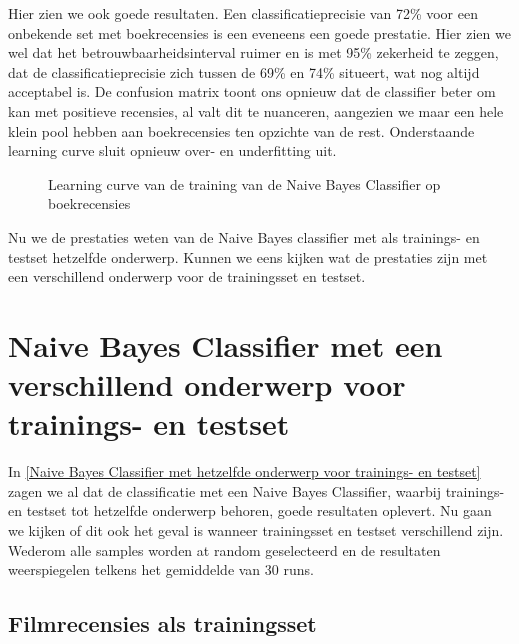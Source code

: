 Hier zien we ook goede resultaten. Een classificatieprecisie van 72\% voor een onbekende set met boekrecensies is een eveneens een goede prestatie. Hier zien we wel dat het betrouwbaarheidsinterval ruimer en is met 95\% zekerheid te zeggen, dat de classificatieprecisie zich tussen de 69\% en 74\% situeert, wat nog altijd acceptabel is. De confusion matrix toont ons opnieuw dat de classifier beter om kan met positieve recensies, al valt dit te nuanceren, aangezien we maar een hele klein pool hebben aan boekrecensies ten opzichte van de rest. Onderstaande learning curve sluit opnieuw over- en underfitting uit.\\
\newpage
\begin{figure}%
    \centering
    \label{fig:lc-boek-boek}
    \caption{Learning curve van de training van de Naive Bayes Classifier op boekrecensies}
\end{figure}

Nu we de prestaties weten van de Naive Bayes classifier met als trainings- en testset hetzelfde onderwerp. Kunnen we eens kijken wat de prestaties zijn met een verschillend onderwerp voor de trainingsset en testset.  

\section{Naive Bayes Classifier met een verschillend onderwerp voor trainings- en testset}\label{Naive Bayes Classifier met verschillend onderwerp voor trainings- en testset}

In \ref{Naive Bayes Classifier met hetzelfde onderwerp voor trainings- en testset} zagen we al dat de classificatie met een Naive Bayes Classifier, waarbij trainings- en testset tot hetzelfde onderwerp behoren, goede resultaten oplevert. Nu gaan we kijken of dit ook het geval is wanneer trainingsset en testset verschillend zijn. Wederom alle samples worden at random geselecteerd en de resultaten weerspiegelen telkens het gemiddelde van 30 runs.  

\subsection{Filmrecensies als trainingsset}\label{Filmrecensies als trainingsset}

